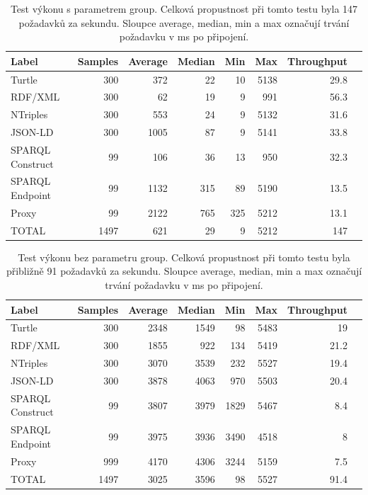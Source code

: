 \documentclass[thesis=B,czech]{FITthesis}[2012/06/26]
\begin{document}
  \begin{table}\centering
 	\caption[Test výkonu - s parametrem group]{Test výkonu s parametrem group. Celková propustnost při tomto testu byla 147 požadavků za sekundu. Sloupce average, median, min a max označují trvání požadavku v ms po připojení.}\label{performance1}
 	\begin{tabular}{|l|r|r|r|r|r|r|r|}\hline
Label				& 	Samples&	Average &	Median &Min &	Max &		Throughput \tabularnewline \hline \hline
 Turtle		&	300	&	372	&	22&	10 &	5138&		29.8\tabularnewline \hline
 RDF/XML 		&	300	&	62	&	19&	9&	991	&	56.3\tabularnewline \hline
 NTriples 		&	300	&	553	&	24&	9&	5132 	&	31.6\tabularnewline \hline
 JSON-LD 		&	300	&	1005	&	87&	9&	5141 	&	33.8\tabularnewline \hline
 SPARQL Construct 	&	99	&	106	&	36&	13&	950 	&	32.3\tabularnewline \hline
 SPARQL Endpoint 	&	99	&	1132	&	315&	89&	5190 	&	13.5\tabularnewline \hline
 Proxy 		&	99	&	2122	&	765&	325&	5212 	&	13.1\tabularnewline \hline
TOTAL				&	1497	&	621	&	29&	9&	5212 	&	147\tabularnewline \hline
 	\end{tabular}
 \end{table}
 
   \begin{table}\centering
 	\caption[Test výkonu - bez parametru group]{Test výkonu bez parametru group. Celková propustnost při tomto testu byla přibližně 91 požadavků za sekundu. Sloupce average, median, min a max označují trvání požadavku v ms po připojení.}\label{performance2}
 	\begin{tabular}{|l|r|r|r|r|r|r|r|}\hline
Label				& 	Samples&	Average &	Median &Min &	Max &		Throughput \tabularnewline \hline \hline
 Turtle				&300	&2348	&1549	&98	&5483	&19\tabularnewline \hline
 RDF/XML 			&300	&1855	&922	&134	&5419	&21.2\tabularnewline \hline
 NTriples 			&300	&3070	&3539	&232	&5527	&19.4\tabularnewline \hline
 JSON-LD 			&300	&3878	&4063	&970	&5503	&20.4\tabularnewline \hline
 SPARQL Construct 		&99	&3807	&3979	&1829	&5467	&8.4\tabularnewline \hline
 SPARQL Endpoint 		&99	&3975	&3936	&3490	&4518	&8\tabularnewline \hline
 Proxy 				&999	&4170	&4306	&3244	&5159	&7.5\tabularnewline \hline
TOTAL				&1497	&3025	&3596	&98	&5527	&91.4\tabularnewline \hline
 	\end{tabular}
 \end{table}
  
\begin{conclusion}


\end{conclusion}



\end{document}
